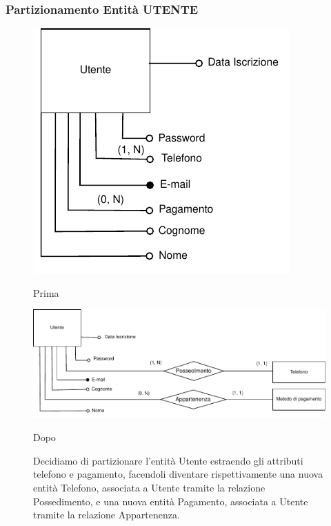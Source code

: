 \subsubsection{Partizionamento Entità UTENTE}
\begin{figure}[H]
      \centering
      \begin{minipage}[b]{0.27\textwidth}
            \includegraphics[width=\textwidth]{resources/pdf/page15.pdf}
            \caption{Prima}
      \end{minipage}
      \hfill
      \begin{minipage}[b]{0.63\textwidth}
            \includegraphics[width=\textwidth]{resources/pdf/page16.pdf}
            \caption{Dopo}
      \end{minipage}
      \caption*{Decidiamo di partizionare l'entità Utente estraendo gli attributi telefono e pagamento, facendoli diventare rispettivamente una nuova entità Telefono, associata a Utente tramite la relazione Possedimento, e una nuova entità Pagamento, associata a Utente tramite la relazione Appartenenza.}
\end{figure}

